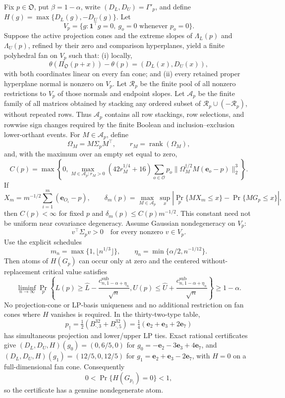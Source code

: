 Fix \(p\in\mathfrak O\), put \(\beta=1-\alpha\), write \((D_L,D_U)=\Gamma'_p\), and define \(H(g)=\max\{D_L(g),-D_U(g)\}\).  Let
\[
V_p=\{g:\mathbf 1^{\top}g=0,\ g_o=0\text{ whenever }p_o=0\}.
\]
Suppose the active projection cones and the extreme slopes of \(\Lambda_L(p)\) and \(\Lambda_U(p)\), refined by their zero and comparison hyperplanes, yield a finite polyhedral fan on \(V_p\) such that: (i) locally,
\[
\theta(\Pi_{\mathfrak O}(p+x))-\theta(p)=(D_L(x),D_U(x)),
\]
with both coordinates linear on every fan cone; and (ii) every retained proper hyperplane normal is nonzero on \(V_p\).  Let \(\mathcal R_p\) be the finite pool of all nonzero restrictions to \(V_p\) of those normals and endpoint slopes.  Let \(\mathcal A_p\) be the finite family of all matrices obtained by stacking any ordered subset of \(\mathcal R_p\cup(-\mathcal R_p)\), without repeated rows.  Thus \(\mathcal A_p\) contains all row stackings, row selections, and rowwise sign changes required by the finite Boolean and inclusion--exclusion lower-orthant events.  For \(M\in\mathcal A_p\), define
\[
\Omega_M=M\Sigma_pM^{\top},\qquad r_M=\operatorname{rank}(\Omega_M),
\]
and, with the maximum over an empty set equal to zero,
\[
C(p)=\max\left\{0,\max_{M\in\mathcal A_p:r_M>0}(42r_M^{1/4}+16)
\sum_{o\in\mathcal O}p_o
\|\Omega_M^{\dagger/2}M(\mathbf e_o-p)\|_2^3\right\}.
\]
If
\[
X_m=m^{-1/2}\sum_{i=1}^m(\mathbf e_{O_i}-p),
\qquad
\delta_m(p)=\max_{M\in\mathcal A_p}\sup_x
\left|\Pr_p\{MX_m\leq x\}-\Pr\{MG_p\leq x\}\right|,
\]
then \(C(p)<\infty\) for fixed \(p\) and \(\delta_m(p)\leq C(p)m^{-1/2}\).  This constant need not be uniform near covariance degeneracy.  Assume Gaussian nondegeneracy on \(V_p\):
\[
v^{\top}\Sigma_pv>0\quad\text{for every nonzero }v\in V_p.
\]
Use the explicit schedules
\[
m_n=\max\{1,\lfloor n^{1/3}\rfloor\},
\qquad
\eta_n=\min\{\alpha/2,n^{-1/12}\}.
\]
Then atoms of \(H(G_p)\) can occur only at zero and the centered without-replacement critical value satisfies
\[
\liminf_{n\to\infty}\Pr_p\left\{
L(p)\geq\widehat L-\frac{c^{\mathrm{sub}}_{n,1-\alpha+\eta_n}}{\sqrt n},
U(p)\leq\widehat U+\frac{c^{\mathrm{sub}}_{n,1-\alpha+\eta_n}}{\sqrt n}
\right\}\geq1-\alpha.
\]
No projection-cone or LP-basis uniqueness and no additional restriction on fan cones where \(H\) vanishes is required.  In the thirty-two-type table,
\[
p_\dagger=\tfrac12(B^{32}_{\cdot,3}+B^{32}_{\cdot,5})
=\tfrac14(\mathbf e_2+\mathbf e_3+2\mathbf e_7)
\]
has simultaneous projection and lower/upper LP ties.  Exact rational certificates give \((D_L,D_U,H)(g_0)=(0,6/5,0)\) for \(g_0=-\mathbf e_2-3\mathbf e_3+4\mathbf e_7\), and \((D_L,D_U,H)(g_1)=(12/5,0,12/5)\) for \(g_1=\mathbf e_2+\mathbf e_3-2\mathbf e_7\), with \(H=0\) on a full-dimensional fan cone.  Consequently
\[
0<\Pr\{H(G_{p_\dagger})=0\}<1,
\]
so the certificate has a genuine nondegenerate atom.